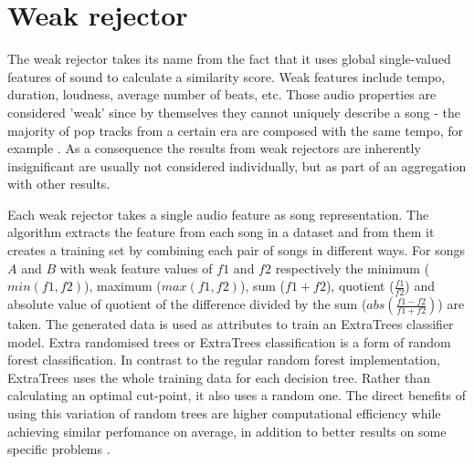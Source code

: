 \section{Weak rejector} 
\label{sec:weakfeatures}

The weak rejector takes its name from the fact that it uses global single-valued
features of sound to calculate a similarity score. Weak features include tempo,
duration, loudness, average number of beats, etc. Those audio properties are
considered 'weak' since by themselves they cannot uniquely describe a song - the
majority of pop tracks from a certain era are composed with the same tempo, for
example \cite{slowpop}. As a consequence the results from weak rejectors are
inherently insignificant are usually not considered individually, but as
part of an aggregation with other results.

Each weak rejector takes a single audio feature as song representation. The
algorithm extracts the feature from each song in a dataset and from them it
creates a training set by combining each pair of songs in different ways. For
songs $A$ and $B$ with weak feature values of $f1$ and $f2$ respectively the
minimum ($min(f1, f2)$), maximum ($max(f1, f2)$), sum ($f1 + f2$), quotient
($\frac{f1}{f2}$) and absolute value of quotient of the difference divided by
the sum ($abs(\frac{f1 - f2}{f1 + f2})$) are taken. The generated data is used
as attributes to train an ExtraTrees classifier model. Extra randomised trees or
ExtraTrees classification is a form of random forest classification. In
contrast to the regular random forest implementation, ExtraTrees uses the whole
training data for each decision tree. Rather than calculating an optimal
cut-point, it also uses a random one. The direct benefits of using this
variation of random trees are higher computational efficiency while achieving
similar perfomance on average, in addition to better results on some specific
problems \cite{geurts2006extremely}.


